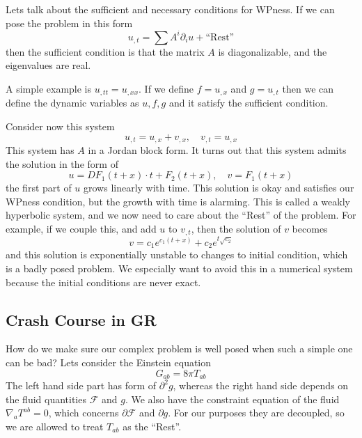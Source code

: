 \documentclass[letterpaper, 11pt]{article}
\numberwithin{equation}{section}
\numberwithin{figure}{section}
\begin{document}
Lets talk about the sufficient and necessary conditions for WPness. If we can
pose the problem in this form
\begin{equation}
  \label{eq:2}
  u_{,t} = \sum A^i\partial_iu + \text{``Rest''}
\end{equation}
then the sufficient condition is that the matrix $A$ is diagonalizable, and the
eigenvalues are real.

A simple example is $u_{,tt} = u_{,xx}$. If we define $f = u_{,x}$ and $g =
u_{,t}$ then we can define the dynamic variables as $u, f, g$ and it satisfy the
sufficient condition.

Consider now this system
\begin{equation}
  \label{eq:3}
  u_{,t} = u_{,x} + v_{,x},\quad v_{,t} = u_{,x}
\end{equation}
This system has $A$ in a Jordan block form. It turns out that this system admits
the solution in the form of
\begin{equation}
  \label{eq:4}
  u = DF_1(t + x)\cdot t + F_2(t + x),\quad v = F_1(t + x)
\end{equation}
the first part of $u$ grows linearly with time. This solution is okay and
satisfies our WPness condition, but the growth with time is alarming. This is
called a weakly hyperbolic system, and we now need to care about the ``Rest'' of
the problem. For example, if we couple this, and add $u$ to $v_{,t}$, then the solution of
$v$ becomes
\begin{equation}
  \label{eq:5}
  v = c_1e^{c_1(t+x)} + c_2e^{t\sqrt{c_2}}
\end{equation}
and this solution is exponentially unstable to changes to initial condition,
which is a badly posed problem. We especially want to avoid this in a numerical
system because the initial conditions are never exact.

\subsection{Crash Course in GR}

How do we make sure our complex problem is well posed when such a simple one can
be bad? Lets consider the Einstein equation
\begin{equation}
  \label{eq:6}
  G_{ab} = 8\pi T_{ab}
\end{equation}
The left hand side part has form of $\partial^{2}g$, whereas the right hand side
depends on the fluid quantities $\mathcal{F}$ and $g$. We also have the
constraint equation of the fluid $\nabla_aT^{ab} = 0$, which concerns $\partial
\mathcal{F}$ and $\partial g$. For our purposes they are decoupled, so we are
allowed to treat $T_{ab}$ as the ``Rest''.
\end{document}
